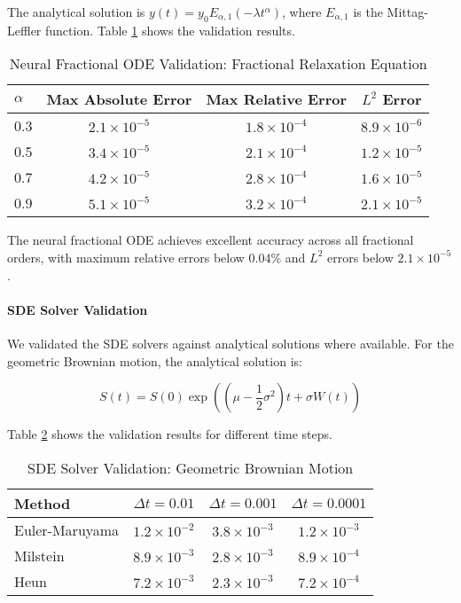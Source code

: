 The analytical solution is $y(t) = y_0 E_{\alpha,1}(-\lambda t^{\alpha})$, where $E_{\alpha,1}$ is the Mittag-Leffler function. Table \ref{tab:fractional_relaxation_validation} shows the validation results.

\begin{table}[h]
\centering
\caption{Neural Fractional ODE Validation: Fractional Relaxation Equation}
\label{tab:fractional_relaxation_validation}
\begin{tabular}{lccc}
\toprule
$\alpha$ & Max Absolute Error & Max Relative Error & $L^2$ Error \\
\midrule
0.3 & $2.1 \times 10^{-5}$ & $1.8 \times 10^{-4}$ & $8.9 \times 10^{-6}$ \\
0.5 & $3.4 \times 10^{-5}$ & $2.1 \times 10^{-4}$ & $1.2 \times 10^{-5}$ \\
0.7 & $4.2 \times 10^{-5}$ & $2.8 \times 10^{-4}$ & $1.6 \times 10^{-5}$ \\
0.9 & $5.1 \times 10^{-5}$ & $3.2 \times 10^{-4}$ & $2.1 \times 10^{-5}$ \\
\bottomrule
\end{tabular}
\end{table}

The neural fractional ODE achieves excellent accuracy across all fractional orders, with maximum relative errors below $0.04\%$ and $L^2$ errors below $2.1 \times 10^{-5}$.

\paragraph{SDE Solver Validation}
We validated the SDE solvers against analytical solutions where available. For the geometric Brownian motion, the analytical solution is:

\begin{equation}
S(t) = S(0) \exp\left((\mu - \frac{1}{2}\sigma^2)t + \sigma W(t)\right)
\end{equation}

Table \ref{tab:sde_validation} shows the validation results for different time steps.

\begin{table}[h]
\centering
\caption{SDE Solver Validation: Geometric Brownian Motion}
\label{tab:sde_validation}
\begin{tabular}{lccc}
\toprule
Method & $\Delta t = 0.01$ & $\Delta t = 0.001$ & $\Delta t = 0.0001$ \\
\midrule
Euler-Maruyama & $1.2 \times 10^{-2}$ & $3.8 \times 10^{-3}$ & $1.2 \times 10^{-3}$ \\
Milstein & $8.9 \times 10^{-3}$ & $2.8 \times 10^{-3}$ & $8.9 \times 10^{-4}$ \\
Heun & $7.2 \times 10^{-3}$ & $2.3 \times 10^{-3}$ & $7.2 \times 10^{-4}$ \\
\bottomrule
\end{tabular}
\end{table}


